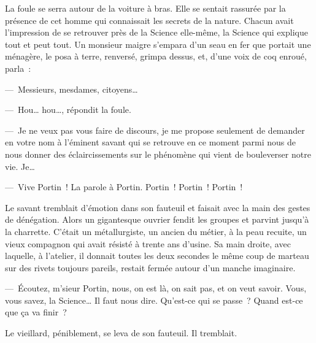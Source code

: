 {

La foule se serra autour de la voiture à bras. Elle se sentait
rassurée par la présence de cet homme qui connaissait les secrets de
la nature. Chacun avait l'impression de se retrouver près de la
Science elle-même, la Science qui explique tout et peut tout. Un
monsieur maigre s'empara d'un seau en fer que portait une ménagère,
le posa à terre, renversé, grimpa dessus, et, d'une voix de coq
enroué, parla~:

—~Messieurs, mesdames, citoyens…

—~Hou… hou…, répondit la foule.

—~Je ne veux pas vous faire de discours, je me propose seulement de
demander en votre nom à l'éminent savant qui se retrouve en ce moment
parmi nous de nous donner des éclaircissements sur le phénomène qui
vient de bouleverser notre vie. Je…

—~Vive Portin~! La parole à Portin. Portin~! Portin~! Portin~!

Le savant tremblait d'émotion dans son fauteuil et faisait avec la
main des gestes de dénégation. Alors un gigantesque ouvrier fendit
les groupes et parvint jusqu'à la charrette. C'était un
métallurgiste, un ancien du métier, à la peau recuite, un vieux
compagnon qui avait résisté à trente ans d'usine. Sa main droite,
avec laquelle, à l'atelier, il donnait toutes les deux secondes le
même coup de marteau sur des rivets toujours pareils, restait fermée
autour d'un manche imaginaire.

—~Écoutez, m'sieur Portin, nous, on est là, on sait pas, et on veut
savoir. Vous, vous savez, la Science… Il faut nous dire. Qu'est-ce
qui se passe~? Quand est-ce que ça va finir~?

Le vieillard, péniblement, se leva de son fauteuil. Il tremblait.

}
